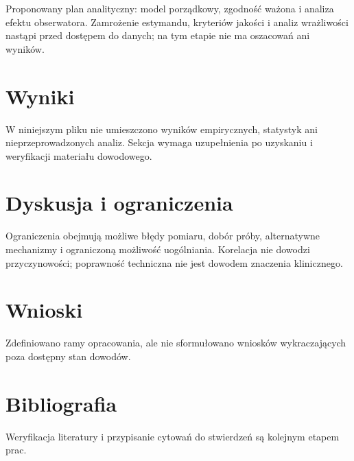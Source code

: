 \documentclass[11pt,a4paper]{article}
\begin{document}
Proponowany plan analityczny: model porządkowy, zgodność ważona i analiza efektu obserwatora. Zamrożenie estymandu, kryteriów jakości i analiz wrażliwości nastąpi przed dostępem do danych; na tym etapie nie ma oszacowań ani wyników.

\section{Wyniki}

W niniejszym pliku nie umieszczono wyników empirycznych, statystyk ani nieprzeprowadzonych analiz. Sekcja wymaga uzupełnienia po uzyskaniu i weryfikacji materiału dowodowego.

\section{Dyskusja i ograniczenia}

Ograniczenia obejmują możliwe błędy pomiaru, dobór próby, alternatywne mechanizmy i ograniczoną możliwość uogólniania. Korelacja nie dowodzi przyczynowości; poprawność techniczna nie jest dowodem znaczenia klinicznego.

\section{Wnioski}

Zdefiniowano ramy opracowania, ale nie sformułowano wniosków wykraczających poza dostępny stan dowodów.

\section*{Bibliografia}

Weryfikacja literatury i przypisanie cytowań do stwierdzeń są kolejnym etapem prac.
\end{document}
